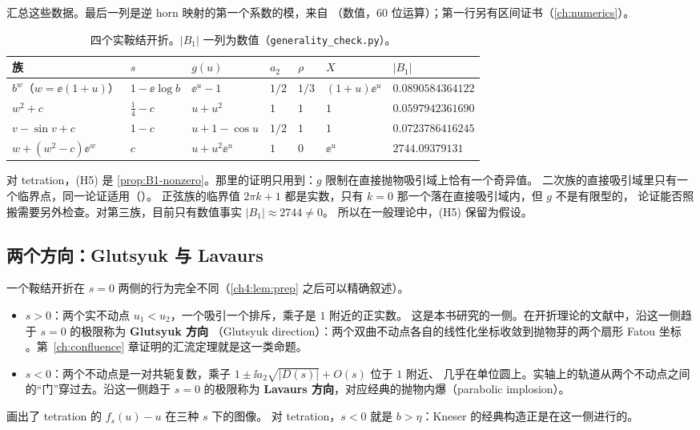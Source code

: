  汇总这些数据。最后一列是逆 horn 映射的第一个系数的模，来自
\cite[注~9.14]{KneserPaper}（数值，60 位运算）；第一行另有区间证书（\cref{ch:numerics}）。

\begin{table}[htbp]
\centering
\caption{四个实鞍结开折。$|B_1|$ 一列为数值（\texttt{generality\_check.py}）。}
\label{ch4:tab:families}
\small
\begin{tabular}{lllllll}
\toprule
族 & $s$ & $g(u)$ & $a_2$ & $\rho$ & $X$ & $|B_1|$\\
\midrule
$b^w$（$w=\ee(1+u)$） & $1-\ee\log b$ & $\ee^u-1$ & $1/2$ & $1/3$ & $(1+u)\ee^u$ & $0.0890584364122$\\
$w^2+c$ & $\tfrac14-c$ & $u+u^2$ & $1$ & $1$ & $1$ & $0.0597942361690$\\
$v-\sin v+c$ & $1-c$ & $u+1-\cos u$ & $1/2$ & $1$ & $1$ & $0.0723786416245$\\
$w+(w^2-c)\ee^w$ & $c$ & $u+u^2\ee^u$ & $1$ & $0$ & $\ee^u$ & $2744.09379131$\\
\bottomrule
\end{tabular}
\end{table}

\begin{remark}[(H5) 在各例中的状态]\label{ch4:rem:H5}
对 tetration，(H5) 是 \cref{prop:B1-nonzero}。那里的证明只用到：$g$ 限制在直接抛物吸引域上恰有一个奇异值。
二次族的直接吸引域里只有一个临界点，同一论证适用（\cite[注~9.5]{KneserPaper}）。
正弦族的临界值 $2\pi k+1$ 都是实数，只有 $k=0$ 那一个落在直接吸引域内，但 $g$ 不是有限型的，
论证能否照搬需要另外检查。对第三族，目前只有数值事实 $|B_1|\approx2744\ne0$。
所以在一般理论中，(H5) 保留为假设。
\end{remark}

\subsection{两个方向：Glutsyuk 与 Lavaurs}

一个鞍结开折在 $s=0$ 两侧的行为完全不同（\cref{ch4:lem:prep} 之后可以精确叙述）。
\begin{itemize}
\item $s>0$：两个实不动点 $u_1<u_2$，一个吸引一个排斥，乘子是 $1$ 附近的正实数。
  这是本书研究的一侧。在开折理论的文献中，沿这一侧趋于 $s=0$ 的极限称为 \textbf{Glutsyuk 方向}
  （Glutsyuk direction）：两个双曲不动点各自的线性化坐标收敛到抛物芽的两个扇形 Fatou 坐标
  \cite{Glutsyuk2001}。第~\ref{ch:confluence} 章证明的汇流定理就是这一类命题。
\item $s<0$：两个不动点是一对共轭复数，乘子 $1\pm\ii a_2\sqrt{|D(s)|}+O(s)$ 位于 $1$ 附近、
  几乎在单位圆上。实轴上的轨道从两个不动点之间的``门''穿过去。沿这一侧趋于 $s=0$ 的极限称为
  \textbf{Lavaurs 方向}，对应经典的抛物内爆（parabolic implosion）\cite{Lavaurs1989,Shishikura2000,Oudkerk1999}。
\end{itemize}
 画出了 tetration 的 $f_s(u)-u$ 在三种 $s$ 下的图像。
对 tetration，$s<0$ 就是 $b>\eta$：Kneser 的经典构造正是在这一侧进行的。

